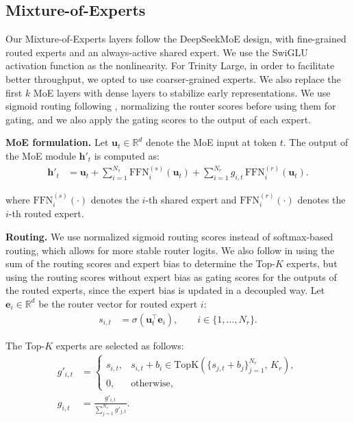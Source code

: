 \documentclass{article}
\begin{document}
\subsection{Mixture-of-Experts}

Our Mixture-of-Experts layers follow the DeepSeekMoE \citep{dai2024deepseekmoeultimateexpertspecialization} design, with fine-grained routed experts and an always-active shared expert. We use the SwiGLU \citep{shazeer2020gluvariantsimprovetransformer} activation function as the nonlinearity. For Trinity Large, in order to facilitate better throughput, we opted to use coarser-grained experts. We also replace the first $k$ MoE layers with dense layers to stabilize early representations. We use sigmoid routing following \cite{wang2024auxiliarylossfreeloadbalancingstrategy}, normalizing the router scores before using them for gating, and we also apply the gating scores to the output of each expert.
    
\noindent\textbf{MoE formulation.}
Let $\mathbf{u}_t\in\mathbb{R}^{d}$ denote the MoE input at token $t$.
The output of the MoE module $\mathbf{h}'_t$ is computed as:
\begin{align}
\mathbf{h}'_t
&=
\mathbf{u}_t
+
\sum_{i=1}^{N_s}\mathrm{FFN}^{(s)}_{i}\!\left(\mathbf{u}_t\right)
+
\sum_{i=1}^{N_r} g_{i,t}\,\mathrm{FFN}^{(r)}_{i}\!\left(\mathbf{u}_t\right).
\tag{15}
\end{align}

where $\mathrm{FFN}^{(s)}_i(\cdot)$ denotes the $i$-th shared expert and $\mathrm{FFN}^{(r)}_i(\cdot)$ denotes the $i$-th routed expert.


\noindent\textbf{Routing.}
We use normalized sigmoid routing scores instead of softmax-based routing, which allows for more stable router logits. We also follow \cite{wang2024auxiliarylossfreeloadbalancingstrategy} in using the sum of the routing scores and expert bias to determine the Top-$K$ experts, but using the routing scores without expert bias as gating scores for the outputs of the routed experts, since the expert bias is updated in a decoupled way.
Let $\mathbf{e}_i\in\mathbb{R}^{d}$ be the router vector for routed expert $i$:
\begin{align}
s_{i,t}
&=
\sigma\!\left(\mathbf{u}_t^{\top}\mathbf{e}_i\right),
\qquad i\in\{1,\dots,N_r\}.
\tag{16}
\end{align}

The Top-$K$ experts are selected as follows:
\begin{align}
g'_{i,t}
&=
\begin{cases}
s_{i,t},
&
s_{i,t} + b_i \in \mathrm{TopK}\!\left(\{s_{j,t}+b_j\}_{j=1}^{N_r},\,K_r\right),
\\[0.2em]
0,
&
\text{otherwise},
\end{cases}
\tag{17}\\
g_{i,t}
&=
\frac{g'_{i,t}}{\sum_{j=1}^{N_r} g'_{j,t}}.
\tag{18}
\end{align}
\end{document}

